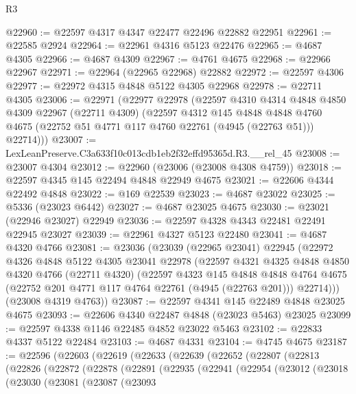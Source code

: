 \begin{lexlean}{R3}
\begin{coremodule}
@22960 := @22597 @4317 @4347 @22477 @22496 @22882 @22951
@22961 := @22585 @2924
@22964 := @22961 @4316 @5123 @22476
@22965 := @4687 @4305
@22966 := @4687 @4309
@22967 := @4761 @4675
@22968 := @22966 @22967
@22971 := @22964 (@22965 @22968) @22882
@22972 := @22597 @4306
@22977 := @22972 @4315 @4848 @5122 @4305 @22968
@22978 := @22711 @4305
@23006 := @22971
    (@22977
      @22978
      (@22597
        @4310
        @4314
        @4848
        @4850
        @4309
        @22967
        (@22711 @4309)
        (@22597
          @4312
          @145
          @4848
          @4848
          @4760
          @4675
          (@22752 @51 @4771 @117 @4760 @22761 (@4945 (@22763 @51)))
          @22714)))
@23007 := LexLeanPreserve.C3a633f10c013cdb1eb2f32effd95365d.R3.__rel_45
@23008 := @23007 @4304
@23012 := @22960 (@23006 (@23008 @4308 @4759))
@23018 := @22597 @4345 @145 @22494 @4848 @22949 @4675
@23021 := @22606 @4344 @22492 @4848
@23022 := @169 @22539
@23023 := @4687 @23022
@23025 := @5336 (@23023 @6442)
@23027 := @4687 @23025 @4675
@23030 := @23021 (@22946 @23027) @22949
@23036 := @22597 @4328 @4343 @22481 @22491 @22945 @23027
@23039 := @22961 @4327 @5123 @22480
@23041 := @4687 @4320 @4766
@23081 := @23036
    (@23039
      (@22965 @23041)
      @22945
      (@22972
        @4326
        @4848
        @5122
        @4305
        @23041
        @22978
        (@22597
          @4321
          @4325
          @4848
          @4850
          @4320
          @4766
          (@22711 @4320)
          (@22597
            @4323
            @145
            @4848
            @4848
            @4764
            @4675
            (@22752 @201 @4771 @117 @4764 @22761 (@4945 (@22763 @201)))
            @22714)))
      (@23008 @4319 @4763))
@23087 := @22597 @4341 @145 @22489 @4848 @23025 @4675
@23093 := @22606 @4340 @22487 @4848 (@23023 @5463) @23025
@23099 := @22597 @4338 @1146 @22485 @4852 @23022 @5463
@23102 := @22833 @4337 @5122 @22484
@23103 := @4687 @4331
@23104 := @4745 @4675
@23187 := @22596
    (@22603
      (@22619
        (@22633
          (@22639
            (@22652
              (@22807
                (@22813
                  (@22826
                    (@22872
                      (@22878
                        (@22891
                          (@22935
                            (@22941
                              (@22954
                                (@23012
                                  (@23018
                                    (@23030
                                      (@23081
                                        (@23087
                                          (@23093

\end{coremodule}
\end{lexlean}

